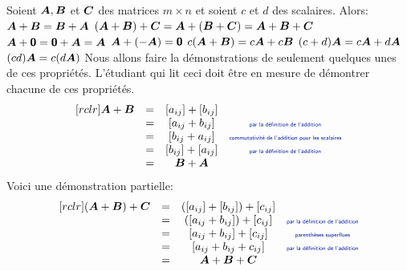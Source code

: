 \begin{theo} \label{prop:add}
Soient $\boldsymbol{A}, \boldsymbol{B}$ et $\boldsymbol{C}$ des matrices $m\times n$ et soient $c$ et $d$ des
scalaires.  Alors:
 $\boldsymbol{A} + \boldsymbol{B} = \boldsymbol{B} + \boldsymbol{A}$
 $(\boldsymbol{A} + \boldsymbol{B}) + \boldsymbol{C} = \boldsymbol{A} + (\boldsymbol{B} + \boldsymbol{C}) = \boldsymbol{A} + \boldsymbol{B} + \boldsymbol{C}$
 $\boldsymbol{A} + \mbox{\textsf{\textbf{{0}}}} = \mbox{\textsf{\textbf{{0}}}} + \boldsymbol{A} = \boldsymbol{A}$
 $\boldsymbol{A} + (-\boldsymbol{A}) = \mbox{\textsf{\textbf{{0}}}}$
 $c(\boldsymbol{A}+\boldsymbol{B}) = c\boldsymbol{A} + c\boldsymbol{B}$
 $(c+d) \boldsymbol{A} = c\boldsymbol{A} + d\boldsymbol{A}$
 $(cd) \boldsymbol{A} = c (d\boldsymbol{A})$
\proof
Nous allons faire la démonstrations de seulement quelques unes de ces
propriétés. L'étudiant qui lit ceci doit être en mesure de démontrer
chacune de ces propriétés.
\[ \abovedisplayskip-12pt
\begin{matrix}[rclr]
\matA + \matB &=& [a_{ij}] + [b_{ij}] \\
    &=& [a_{ij} + b_{ij}] &\explain{par la définition de l'addition} \\
    &=& [b_{ij} + a_{ij}] &\explain{commutativité de l'addition pour les scalaires}\\
    &=& [b_{ij}] + [a_{ij}] &\explain{par la définition de l'addition} \\
    &=& \matB + \matA
    \end{matrix}
\] \cqfd
{}  Voici une démonstration partielle:
\[
\begin{matrix}[rclr]
(\matA + \matB) + \matC &=& ([a_{ij}] + [b_{ij}]) + [c_{ij}] \\
    &=& ([a_{ij} + b_{ij}]) + [c_{ij}] & \explain{par la définition de l'addition}\\
    &=& [a_{ij} + b_{ij}] + [c_{ij}] &\explain{parenthèses superflues} \\
    &=& [a_{ij} + b_{ij} + c_{ij}] &\explain{par la définition de l'addition} \\
    &=& \matA + \matB + \matC
\end{matrix}
\]\cqfd
\end{theo}
